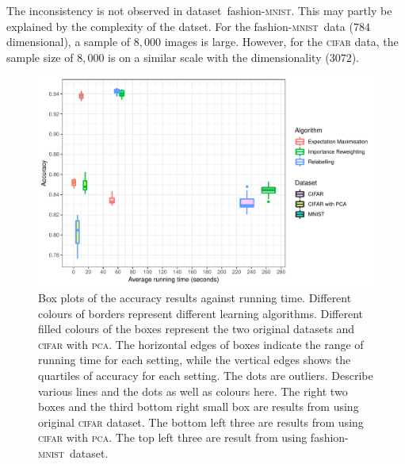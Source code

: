 \documentclass[12pt]{article} %
\newcommand{\mnist}{fashion-\textsc{mnist}}
\begin{document}
The inconsistency is not observed in dataset~\mnist. This may partly be explained by the complexity of the datset. For the \mnist\ data ($784$ dimensional), a sample of $8,000$ images is large. However, for the \textsc{cifar} data, the sample size of $8,000$ is on a similar scale with the dimensionality ($3072$).
\begin{figure}
	\centering
    \includegraphics[scale=0.8]{boxplotv}%
	\caption{Box plots of the accuracy results against running time. Different colours of borders represent different learning algorithms. Different filled colours of the boxes represent the two original datasets and \textsc{cifar} with \textsc{pca}. The horizontal edges of boxes indicate the range of running time for each setting, while the vertical edges shows the quartiles of accuracy for each setting. The dots are outliers. {\color{red}Describe various lines and the dots as well as colours here. }
The right two boxes and the third bottom right small box are results from using original \textsc{cifar} dataset. The bottom left three are results from using \textsc{cifar} with \textsc{pca}. The top left three are result from using \mnist\ dataset.}
	\label{fig:Boxplot}
\end{figure}

\end{document}
